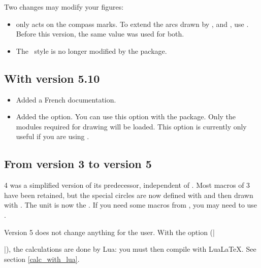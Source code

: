 Two changes may modify your figures:
\begin{itemize}
  \item {}\code{[delta=...]} only acts on the compass marks. To extend the arcs drawn by ,  and , use \code{[delta=...]}. Before this version, the same value was used for both.
  \item The \TIKZ\ style  is no longer modified by the package.
\end{itemize}

\endgroup

\subsection{With version 5.10}
\begin{itemize}
  \item Added a French documentation.
  \item Added the  option. You can use this option with the  package. Only the modules required for drawing will be loaded. This option is currently only useful if you are using .
\end{itemize}

\subsection{From version 3 to version 5}

\tkzname{\tkznameofpack} 4 was a simplified version of its predecessor, independent of . Most macros of  3 have been retained, but the special circles are now defined with  and then drawn with . The unit is now the . If you need some macros from , you may need to use .

Version 5 does not change anything for the user. With the option  (|\usepackage[lua]{tkz-euclide}|), the calculations are done by Lua: you must then compile with LuaLaTeX. See section \ref{calc_with_lua}.

